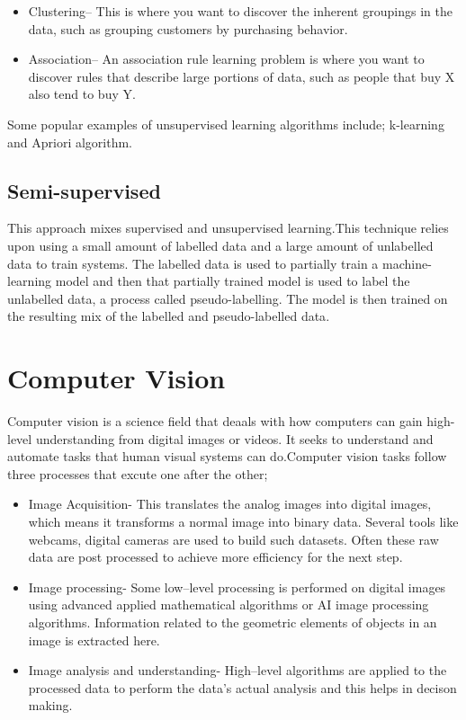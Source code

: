 \documentclass[12pt]{report}
\begin{document}
\begin{itemize}[topsep=0pt]

\item Clustering-- This is where you want to discover the inherent groupings in the data, such as grouping customers by purchasing behavior.

\item Association-- An association rule learning problem is where you want to discover rules that describe large portions of data, such as people that buy X also tend to buy Y.

\end{itemize}
Some popular examples of unsupervised learning algorithms include; k-learning and Apriori algorithm\cite{Unsupervised}.

\subsection{Semi-supervised}
This approach mixes supervised and unsupervised learning.This technique relies upon using a small amount of labelled data and a large amount of unlabelled data to train systems. The labelled data is used to partially train a machine-learning model and then that partially trained model is used to label the unlabelled data, a process called pseudo-labelling. The model is then trained on the resulting mix of the labelled and pseudo-labelled data\cite{Supervised}.


\section{Computer Vision}
Computer vision is a science field that deaals with how computers can gain high-level understanding from digital images or videos. It seeks to understand and automate tasks that human visual systems can do.Computer vision tasks follow three processes that excute one after the other\cite{Vision};

\begin{itemize}[topsep=0pt]

\item Image Acquisition- This translates the analog images into digital images, which means it transforms a normal image into binary data. Several tools like webcams, digital cameras are used to build such datasets. Often these raw data are post processed to achieve more efficiency for the next step.

\item Image processing- Some low--level processing is performed on digital images using advanced applied mathematical algorithms or AI image processing algorithms. Information related to the geometric elements of objects in an image is extracted here.

\item Image analysis and understanding- High--level algorithms are applied to the processed data to perform the data's actual analysis and this helps in decison making\cite{Vision}.
\end{itemize}
\end{document}
